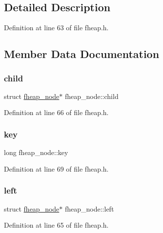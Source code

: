 \subsection{Detailed Description}


Definition at line 63 of file fheap.\+h.



\subsection{Member Data Documentation}
\mbox{\label{structfheap__node_a5c0411a8c1b8e4712852691605484f80}} 
\subsubsection{\texorpdfstring{child}{child}}
{\footnotesize\ttfamily struct \mbox{\hyperlink{structfheap__node}{fheap\+\_\+node}}$\ast$ fheap\+\_\+node\+::child}



Definition at line 66 of file fheap.\+h.

\mbox{\label{structfheap__node_ae5b8eaa56de8c3e43b958bcc9c46a8e3}} 
\subsubsection{\texorpdfstring{key}{key}}
{\footnotesize\ttfamily long fheap\+\_\+node\+::key}



Definition at line 69 of file fheap.\+h.

\mbox{\label{structfheap__node_a714c50b04c29981fa46b7c937b328708}} 
\subsubsection{\texorpdfstring{left}{left}}
{\footnotesize\ttfamily struct \mbox{\hyperlink{structfheap__node}{fheap\+\_\+node}}$\ast$ fheap\+\_\+node\+::left}



Definition at line 65 of file fheap.\+h.

